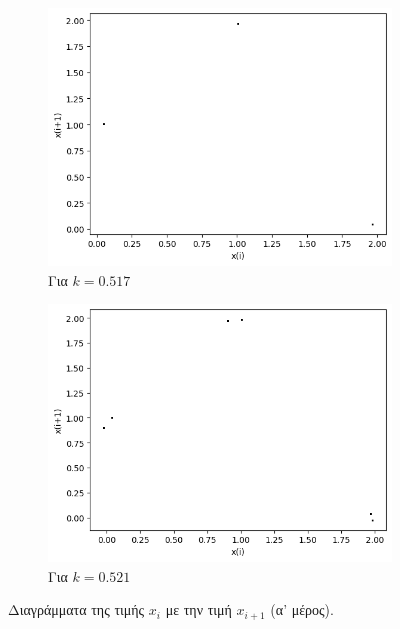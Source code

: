 \begin{figure}[ht]
\begin{subfigure}[b]{0.4\textwidth}
		\includegraphics[width=\textwidth]{LateX images/graphs/k0517}
		\caption{Για $k=0.517$}
	\end{subfigure}
	\hfill
	\begin{subfigure}[b]{0.4\textwidth}
		\centering
		\includegraphics[width=\textwidth]{LateX images/graphs/0.521}
		\caption{Για $k=0.521$}
		\label{f:k7}
	\end{subfigure}
	\hfill
	\caption{Διαγράμματα της τιμής \(x_i\) με την τιμή \(x_{i+1}\) (α' μέρος).}
\end{figure}

